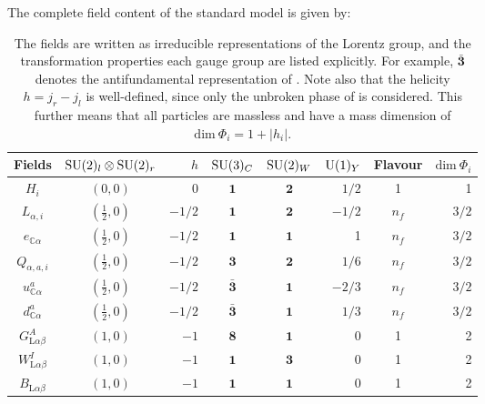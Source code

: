 \begin{table}[htb]
	The complete field content of the standard model is given by:
	\center
	\begin{tabular}{|c|cr|ccr|c|r|}
		\hline
		Fields                            & $ \mathrm{SU}( 2 )_{l} \otimes \mathrm{SU}( 2 )_{r}$ & $h$      & $\mathrm{SU}( 3 )_{C}$       & $\mathrm{SU}( 2 )_{W}$ & $ \mathrm{U}( 1 )_{Y}$ & Flavour  & $ \mathrm{dim}\ \Phi_{i} $ \\[0.65ex]
		\hline
		$H_{i}$                           & $(0,0)$                          & 0        & $\mathbf{1}$       & $\mathbf{2}$ & $1 / 2$      & 1       & 1 \\[0.65ex]
		\hline
		$L_{\alpha, i}$                   & $\left(\tfrac{1}{2}, 0\right)$    & $-1 / 2$ & $\mathbf{1}$       & $\mathbf{2}$ & $-1 / 2$     & $n_{f}$ & $3 / 2$ \\[0.65ex]
		$e_{\mathbb{C} \alpha}$           & $\left(\tfrac{1}{2}, 0\right)$    & $-1 / 2$ & $\mathbf{1}$       & $\mathbf{1}$ & 1            & $n_{f}$ & $3 / 2$ \\[0.65ex]
		$Q_{\alpha, a, i}$                & $\left(\tfrac{1}{2}, 0\right)$    & $-1 / 2$ & $\mathbf{3}$       & $\mathbf{2}$ & $1 / 6$      & $n_{f}$ & $3 / 2$ \\[0.65ex]
		$u_{\mathbb{C} \alpha}^{a}$       & $\left(\tfrac{1}{2}, 0\right)$    & $-1 / 2$ & $\bar{\mathbf{3}}$ & $\mathbf{1}$ & $-2 / 3$     & $n_{f}$ & $3 / 2$ \\[0.65ex]
		$d_{\mathbb{C} \alpha}^{a}$       & $\left(\tfrac{1}{2}, 0\right)$    & $-1 / 2$ & $\bar{\mathbf{3}}$ & $\mathbf{1}$ & $1 / 3$      & $n_{f}$ & $3 / 2$ \\[0.65ex]
		\hline
		$G_{\mathrm{L} \alpha \beta}^{A}$ & $(1,0)$                          & $-1$     & $\mathbf{8}$       & $\mathbf{1}$ & 0            & 1       & 2 \\[0.65ex]
		$W_{\mathrm{L} \alpha \beta}^{I}$ & $(1,0)$                          & $-1$     & $\mathbf{1}$       & $\mathbf{3}$ & 0            & 1       & 2 \\[0.65ex]
		$B_{\mathrm{L} \alpha \beta}$     & $(1,0)$                          & $-1$     & $\mathbf{1}$       & $\mathbf{1}$ & 0            & 1       & 2 \\
		\hline
	\end{tabular}
	\caption{The \sm{} fields are written as irreducible representations of the Lorentz group, and the transformation properties \wrt each gauge group are listed explicitly. For example, $ \bar{\mathbf{3}} $ denotes the antifundamental representation of . Note also that the helicity $ h = j_{r} - j_{l} $ is well-defined, since only the unbroken phase of \smeft{} is considered. This further means that all particles are massless and have a mass dimension of $ \mathrm{dim}\ \Phi_{i} = 1 + |h_{i}| $.}
	\label{tab:fields}
\end{table}
\clearpage
